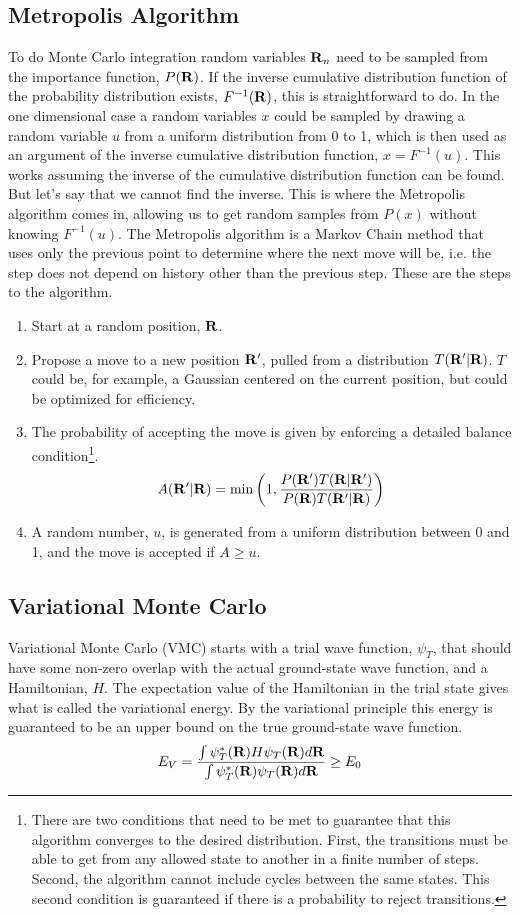 \subsection{Metropolis Algorithm}
To do Monte Carlo integration random variables $\mathbf{R}_n$ need to be sampled from the importance function, $P(\mathbf{R})$. If the inverse cumulative distribution function of the probability distribution exists, $F^{-1}(\mathbf{R})$, this is straightforward to do. In the one dimensional case a random variables $x$ could be sampled by drawing a random variable $u$ from a uniform distribution from 0 to 1, which is then used as an argument of the inverse cumulative distribution function, $x=F^{-1}(u)$. This works assuming the inverse of the cumulative distribution function can be found. But let's say that we cannot find the inverse. This is where the Metropolis algorithm comes in, allowing us to get random samples from $P(x)$ without knowing $F^{-1}(u)$. The Metropolis algorithm is a Markov Chain method that uses only the previous point to determine where the next move will be, i.e. the step does not depend on history other than the previous step. These are the steps to the algorithm.
\begin{enumerate}
   \item Start at a random position, $\mathbf{R}$.
   \item Propose a move to a new position $\mathbf{R}'$, pulled from a distribution $T(\mathbf{R}'|\mathbf{R})$. $T$ could be, for example, a Gaussian centered on the current position, but could be optimized for efficiency.
   \item The probability of accepting the move is given by enforcing a detailed balance condition\footnote{There are two conditions that need to be met to guarantee that this algorithm converges to the desired distribution. First, the transitions must be able to get from any allowed state to another in a finite number of steps. Second, the algorithm cannot include cycles between the same states. This second condition is guaranteed if there is a probability to reject transitions.}.
   \begin{equation}
      A(\mathbf{R}'|\mathbf{R}) = \mathrm{min}\left(1, \frac{P(\mathbf{R}')T(\mathbf{R}|\mathbf{R}')}{P(\mathbf{R})T(\mathbf{R}'|\mathbf{R})}\right)
   \end{equation}
   \item A random number, $u$, is generated from a uniform distribution between 0 and 1, and the move is accepted if $A\ge u$.
\end{enumerate}

\subsection{Variational Monte Carlo}
Variational Monte Carlo (VMC) starts with a trial wave function, $\psi_T$, that should have some non-zero overlap with the actual ground-state wave function, and a Hamiltonian, $H$. The expectation value of the Hamiltonian in the trial state gives what is called the variational energy. By the variational principle this energy is guaranteed to be an upper bound on the true ground-state wave function.
\begin{equation}
   E_V = \frac{\int\psi_T^*(\mathbf{R})H\psi_T(\mathbf{R})d\mathbf{R}}{\int\psi_T^*(\mathbf{R})\psi_T(\mathbf{R})d\mathbf{R}} \ge E_0
\end{equation}

